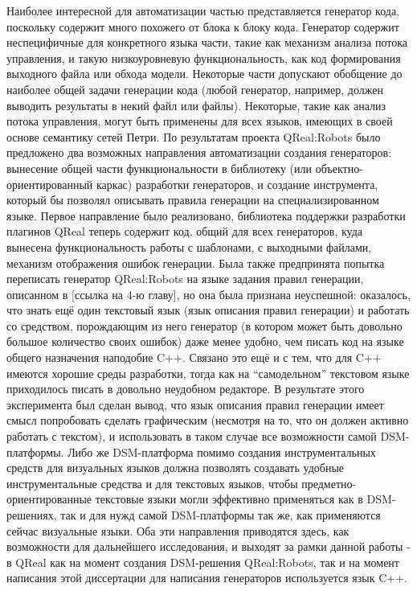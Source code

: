 	Наиболее интересной для автоматизации частью представляется генератор кода, поскольку содержит много похожего от блока к блоку кода. Генератор содержит неспецифичные для конкретного языка части, такие как механизм анализа потока управления, и такую низкоуровневую функциональность, как код формирования выходного файла или обхода модели. Некоторые части допускают обобщение до наиболее общей задачи генерации кода (любой генератор, например, должен выводить результаты в некий файл или файлы). Некоторые, такие как анализ потока управления, могут быть применены для всех языков, имеющих в своей основе семантику сетей Петри. По результатам проекта QReal:Robots было предложено два возможных направления автоматизации создания генераторов: вынесение общей части функциональности в библиотеку (или объектно-ориентированный каркас) разработки генераторов, и создание инструмента, который бы позволял описывать правила генерации на специализированном языке.  Первое направление было реализовано, библиотека поддержки разработки плагинов QReal теперь содержит код, общий для всех генераторов, куда вынесена функциональность работы с шаблонами, с выходными файлами, механизм отображения ошибок генерации. 
Была также предпринята попытка переписать генератор QReal:Robots на языке задания правил генерации, описанном в [ссылка на 4-ю главу], но она была признана неуспешной: оказалось, что знать ещё один текстовый язык (язык описания правил генерации) и работать со средством, порождающим из него генератор (в котором может быть довольно большое количество своих ошибок) даже менее удобно, чем писать код на языке общего назначения наподобие C++. Связано это ещё и с тем, что для C++ имеются хорошие среды разработки, тогда как на “самодельном” текстовом языке приходилось писать в довольно неудобном редакторе. В результате этого эксперимента был сделан вывод, что язык описания правил генерации имеет смысл попробовать сделать графическим (несмотря на то, что он должен активно работать с текстом), и использовать в таком случае все возможности самой DSM-платформы. Либо же DSM-платформа помимо создания инструментальных средств для визуальных языков должна позволять создавать удобные инструментальные средства и для текстовых языков, чтобы предметно-ориентированные текстовые языки могли эффективно применяться как в DSM-решениях, так и для нужд самой DSM-платформы так же, как применяются сейчас визуальные языки. Оба эти направления приводятся здесь, как возможности для дальнейшего исследования, и выходят за рамки данной работы - в QReal как на момент создания DSM-решения QReal:Robots, так и на момент написания этой диссертации для написания генераторов используется язык C++.

